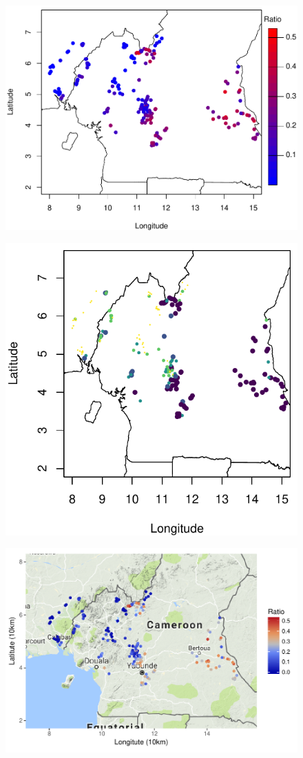 \documentclass[11pt,compress,xcolor=x11names,UTF8]{beamer}
\begin{document}
\begin{frame}
\begin{figure}
\centering
\includegraphics[width=.8\textwidth]{loaloa_ratio}  
\end{figure}
\end{frame}

\begin{frame}
\begin{figure}
\centering
\includegraphics[width=.6\textwidth]{demo02} %
\end{figure}
\end{frame}

\begin{frame}
\begin{figure}
\centering
\includegraphics[width=.8\textwidth]{demo03} %
\end{figure}
\end{frame}
\end{document}
